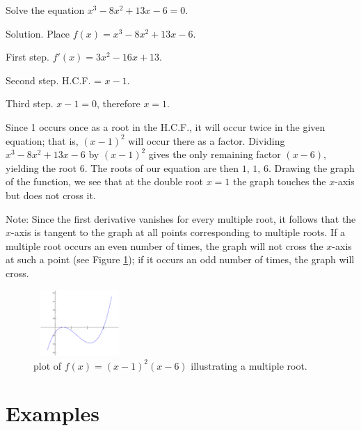 \begin{example}
{\rm
Solve the equation $x^3 - 8x^2 + 13x - 6 = 0$.

Solution. Place 	$f(x) = x^3 - 8x^2 + 13x - 6$.

First step. $f'(x) 	= 3x^2 - 16x + 13$.

Second step. 	H.C.F. 	= $x - 1$.

Third step. $x - 1 = 0$, therefore $x = 1$.

Since 1 occurs once as a root in the H.C.F., it will occur twice 
in the given equation; that is, $(x - 1)^2$ will occur there as 
a factor. Dividing $x^3 - 8x^2 + 13x - 6$ by $(x - 1)^2$ gives the 
only remaining factor $(x - 6)$, yielding the root $6$. The roots 
of our equation are then $1$, $1$, $6$. Drawing the graph of the function, 
we see that at the double root $x = 1$ the graph touches the $x$-axis
but does not cross it.

Note: Since the first derivative vanishes 
for every multiple root, it follows that the $x$-axis is tangent 
to the graph at all points corresponding to multiple roots. If a 
multiple root occurs an even number of times, the graph will not 
cross the $x$-axis at such a point (see Figure \ref{fig:multiple-roots}); 
if it occurs an odd number of times, the graph will cross.

\begin{figure}[h!]
\begin{minipage}{\textwidth}
\begin{center}
\includegraphics[height=2.5cm,width=3.5cm]{multiple-roots.eps}
\end{center}
\end{minipage}
\caption{plot of $f(x) = (x-1)^2(x-6)$ illustrating a multiple root.}
\label{fig:multiple-roots}
\end{figure}



}
\end{example}


\section{Examples}

